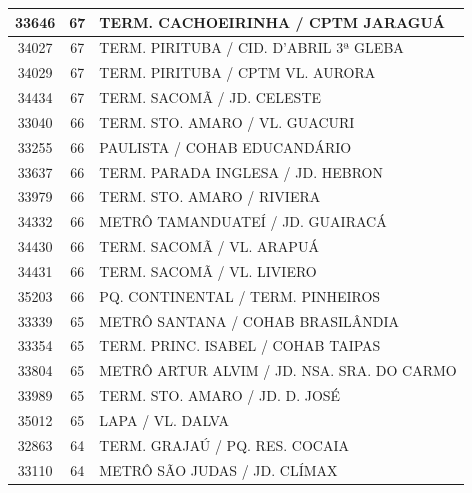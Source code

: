 \documentclass[
	12pt,				%
	oneside,			%
	a4paper,			%
	english,			%
	brazil				%
	]{abntex2ppgsi}
\begin{document}
{{\begin{apendicesenv}
\begin{longtable}{c|c|p{7cm}}
    33646 & 67    & TERM. CACHOEIRINHA / CPTM JARAGUÁ \\
\hline

    34027 & 67    & TERM. PIRITUBA / CID. D'ABRIL 3ª GLEBA \\
\hline

    34029 & 67    & TERM. PIRITUBA / CPTM VL. AURORA \\
\hline

    34434 & 67    & TERM. SACOMÃ / JD. CELESTE \\
\hline

    33040 & 66    & TERM. STO. AMARO / VL. GUACURI \\
\hline

    33255 & 66    & PAULISTA / COHAB EDUCANDÁRIO \\
\hline

    33637 & 66    & TERM. PARADA INGLESA / JD. HEBRON \\
\hline

    33979 & 66    & TERM. STO. AMARO / RIVIERA \\
\hline

    34332 & 66    & METRÔ TAMANDUATEÍ / JD. GUAIRACÁ \\
\hline

    34430 & 66    & TERM. SACOMÃ / VL. ARAPUÁ \\
\hline

    34431 & 66    & TERM. SACOMÃ / VL. LIVIERO \\
\hline

    35203 & 66    & PQ. CONTINENTAL / TERM. PINHEIROS \\
\hline

    33339 & 65    & METRÔ SANTANA / COHAB BRASILÂNDIA \\
\hline

    33354 & 65    & TERM. PRINC. ISABEL / COHAB TAIPAS \\
\hline

    33804 & 65    & METRÔ ARTUR ALVIM / JD. NSA. SRA. DO CARMO \\
\hline

    33989 & 65    & TERM. STO. AMARO / JD. D. JOSÉ \\
\hline

    35012 & 65    & LAPA / VL. DALVA \\
\hline

    32863 & 64    & TERM. GRAJAÚ / PQ. RES. COCAIA \\
\hline

    33110 & 64    & METRÔ SÃO JUDAS / JD. CLÍMAX \\
\hline


\end{longtable}
\end{apendicesenv}}}
\end{document}
